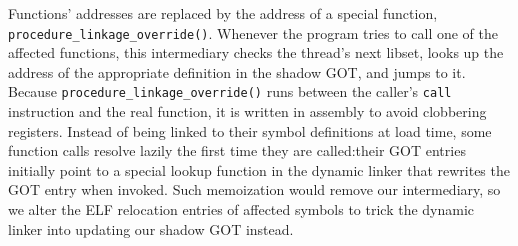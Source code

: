 Functions' addresses are replaced by the address of a special function,
\texttt{procedure\_linkage\_override()}.  Whenever the program tries to call one of
the affected functions, this intermediary checks the thread's next libset, looks up
the address of the appropriate definition in the shadow GOT, and jumps to it.
Because \texttt{procedure\_linkage\_override()} runs between the caller's
\texttt{call} instruction and the real function, it is written in assembly to avoid
clobbering registers.  Instead of being linked to their symbol definitions at load
time, some function calls resolve lazily the first time they are called:\@ their GOT
entries initially point to a special lookup function in the dynamic linker that
rewrites the GOT entry when invoked.  Such memoization would remove our intermediary,
so we alter the ELF relocation entries of affected symbols to trick the dynamic
linker into updating our shadow GOT instead.

